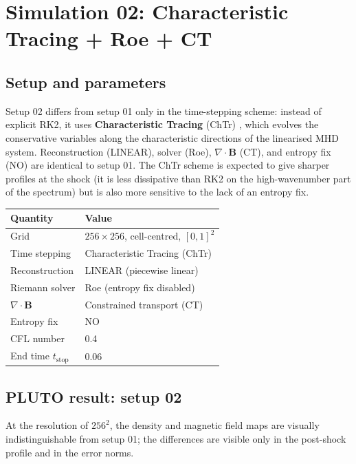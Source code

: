 \documentclass[11pt,a4paper]{article}
\begin{document}
\section{Simulation 02: Characteristic Tracing + Roe + CT}
\label{sec:sim-02}

\subsection{Setup and parameters}

Setup 02 differs from setup 01 only in the time-stepping scheme: instead of explicit RK2, it uses \textbf{Characteristic Tracing} (ChTr) \cite{yee2007}, which evolves the conservative variables along the characteristic directions of the linearised MHD system. Reconstruction (LINEAR), solver (Roe), $\nabla\!\cdot\!\mathbf{B}$ (CT), and entropy fix (NO) are identical to setup 01. The ChTr scheme is expected to give sharper profiles at the shock (it is less dissipative than RK2 on the high-wavenumber part of the spectrum) but is also more sensitive to the lack of an entropy fix.

\medskip
\begin{center}
\small
\begin{tabular}{ll}
\toprule Quantity & Value \\ \midrule
Grid & $256 \times 256$, cell-centred, $[0,1]^2$ \\
Time stepping & Characteristic Tracing (ChTr) \\
Reconstruction & LINEAR (piecewise linear) \\
Riemann solver & Roe (entropy fix disabled) \\
$\nabla\!\cdot\!\mathbf{B}$ & Constrained transport (CT) \\
Entropy fix & NO \\
CFL number & 0.4 \\
End time $t_{\mathrm{stop}}$ & 0.06 \\ \bottomrule
\end{tabular}
\end{center}
\medskip

\subsection{PLUTO result: setup 02}

At the resolution of $256^2$, the density and magnetic field maps are visually indistinguishable from setup 01; the differences are visible only in the post-shock profile and in the error norms.
\end{document}
